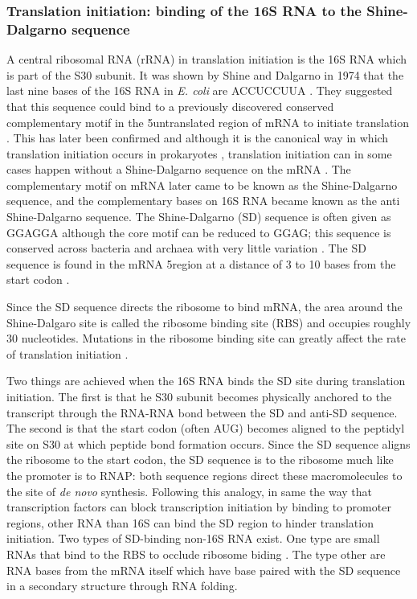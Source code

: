 \subsubsection{Translation initiation: binding of the 16S RNA to the
Shine-Dalgarno sequence} A central ribosomal RNA (rRNA) in translation
initiation is the 16S RNA which is part of the S30 subunit. It was shown by
Shine and Dalgarno in 1974 that the last nine bases of the 16S RNA in
\textit{E. coli} are ACCUCCUUA \cite{shine_3-terminal_1974}. They suggested
that this sequence could bind to a previously discovered conserved
complementary motif in the 5\p untranslated region of mRNA to initiate
translation \cite{shine_3-terminal_1974}. This has later been confirmed and
although it is the canonical way in which translation initiation occurs in
prokaryotes \cite{nakagawa_dynamic_2010}, translation initiation can in some
cases happen without a Shine-Dalgarno sequence on the mRNA
\cite{skorski_highly_2006, boni_non-canonical_2001}.  The complementary motif
on mRNA later came to be known as the Shine-Dalgarno sequence, and the
complementary bases on 16S RNA became known as the anti Shine-Dalgarno
sequence. The Shine-Dalgarno (SD) sequence is often given as GGAGGA although
the core motif can be reduced to GGAG; this sequence is conserved across
bacteria and archaea with very little variation \cite{nakagawa_dynamic_2010}.
The SD sequence is found in the mRNA 5\p region at a distance of 3 to 10 bases
from the start codon \cite{chen_determination_1994-1}.

Since the SD sequence directs the ribosome to bind mRNA, the area around the
Shine-Dalgaro site is called the ribosome binding site (RBS) and occupies
roughly 30 nucleotides. Mutations in the ribosome binding site can greatly
affect the rate of translation initiation \cite{shultzaberger_anatomy_2001}.

Two things are achieved when the 16S RNA binds the SD site during translation
initiation. The first is that he S30 subunit becomes physically anchored to the
transcript through the RNA-RNA bond between the SD and anti-SD sequence.  The
second is that the start codon (often AUG) becomes aligned to the peptidyl site
on S30 at which peptide bond formation occurs. Since the SD sequence aligns the
ribosome to the start codon, the SD sequence is to the ribosome much like the
promoter is to RNAP: both sequence regions direct these macromolecules to the
site of \textit{de novo} synthesis.  Following this analogy, in same the way
that transcription factors can block transcription initiation by binding to
promoter regions, other RNA than 16S can bind the SD region to hinder
translation initiation. Two types of SD-binding non-16S RNA exist. One type are
small RNAs that bind to the RBS to occlude ribosome biding
\cite{storz_controlling_2004}. The type other are RNA bases from the mRNA
itself which have base paired with the SD sequence in a secondary structure
through RNA folding.

